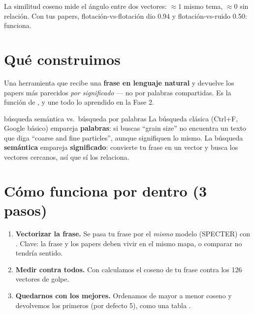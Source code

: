\documentclass[11pt,a4paper]{article}
\begin{document}
\begin{resumen}
La similitud coseno mide el ángulo entre dos vectores: $\approx 1$ mismo tema, $\approx 0$ sin
relación. Con tus papers, flotación-vs-flotación dio 0.94 y flotación-vs-ruido 0.50: funciona.
\end{resumen}
\clearpage
{}
{}

\section{Qué construimos}

Una herramienta que recibe una \textbf{frase en lenguaje natural} y devuelve los papers más
parecidos \emph{por significado} --- no por palabras compartidas. Es la función
 de , y une todo lo aprendido en la Fase 2.

\begin{concepto}{búsqueda semántica vs.\ búsqueda por palabras}
La búsqueda clásica (Ctrl+F, Google básico) empareja \textbf{palabras}: si buscas ``grain
size'' no encuentra un texto que diga ``coarse and fine particles'', aunque signifiquen lo
mismo. La búsqueda \textbf{semántica} empareja \textbf{significado}: convierte tu frase en un
vector y busca los vectores cercanos, así que sí los relaciona.
\end{concepto}

\section{Cómo funciona por dentro (3 pasos)}

\begin{enumerate}
  \item \textbf{Vectorizar la frase.} Se pasa tu frase por el \emph{mismo} modelo (SPECTER)
        con . Clave: la frase y los papers deben vivir en el
        mismo mapa, o comparar no tendría sentido.
  \item \textbf{Medir contra todos.} Con  calculamos el coseno de
        tu frase contra los 126 vectores de golpe.
  \item \textbf{Quedarnos con los mejores.} Ordenamos de mayor a menor coseno y devolvemos los
         primeros (por defecto 5), como una tabla .
\end{enumerate}
\end{document}
